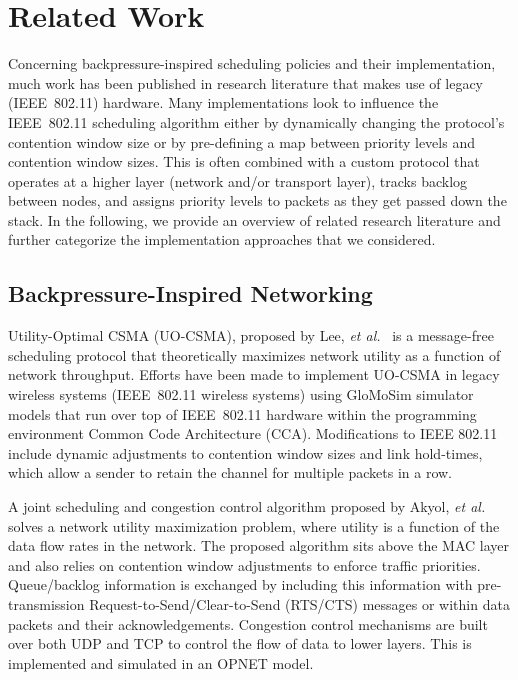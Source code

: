\documentclass{article}
\newcommand{\etal}{\textit{et al.}}
\begin{document}
\section{Related Work}\label{sec:related-work}

Concerning backpressure-inspired scheduling policies and their implementation, much work has been published in research literature that makes use of legacy (IEEE~802.11) hardware.
Many implementations look to influence the IEEE~802.11 scheduling algorithm either by dynamically changing the protocol's contention window size or by pre-defining a map between priority levels and contention window sizes.
This is often combined with a custom protocol that operates at a higher layer (network and/or transport layer), tracks backlog between nodes, and assigns priority levels to packets as they get passed down the stack.
In the following, we provide an overview of related research literature and further categorize the implementation approaches that we considered.


\subsection{Backpressure-Inspired Networking}\label{sec:rel-work-backpressure}

Utility-Optimal CSMA (UO-CSMA), proposed by Lee, \etal\ \cite{LeeLeeYi2009} is a message-free scheduling protocol that theoretically maximizes network utility as a function of network throughput.
Efforts have been made to implement UO-CSMA in legacy wireless systems (IEEE~802.11 wireless systems) using GloMoSim simulator models that run over top of IEEE~802.11 hardware within the programming environment Common Code Architecture (CCA).
Modifications to IEEE 802.11 include dynamic adjustments to contention window sizes and link hold-times, which allow a sender to retain the channel for multiple packets in a row.


A joint scheduling and congestion control algorithm proposed by Akyol, \etal\ \cite{AkyAndGup2008} solves a network utility maximization problem, where utility is a function of the data flow rates in the network.
The proposed algorithm sits above the MAC layer and also relies on contention window adjustments to enforce traffic priorities.
Queue/backlog information is exchanged by including this information with pre-transmission Request-to-Send/Clear-to-Send (RTS/CTS) messages or within data packets and their acknowledgements.
Congestion control mechanisms are built over both UDP and TCP to control the flow of data to lower layers.
This is implemented and simulated in an OPNET model.
\end{document}
